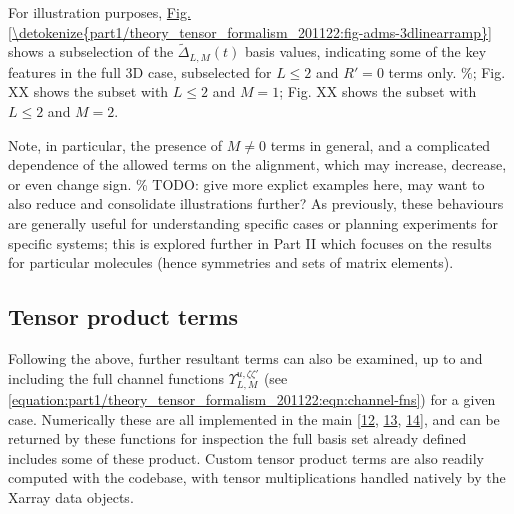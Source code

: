 \documentclass[letterpaper,table,10pt,english]{jupyterBook}
\begin{document}
\sphinxAtStartPar
For illustration purposes, \hyperref[\detokenize{part1/theory_tensor_formalism_201122:fig-adms-3dlinearramp}]{Fig.\@ \ref{\detokenize{part1/theory_tensor_formalism_201122:fig-adms-3dlinearramp}}} shows a subselection of the \(\tilde{\Delta}_{L,M}(t)\) basis values, indicating some of the key features in the full 3D case, subselected for \(L\leq2\) and \(R'=0\) terms only. \%; Fig. XX shows the subset with \(L\leq2\) and \(M=1\); Fig. XX shows the subset with \(L\leq2\) and \(M=2\).

\sphinxAtStartPar
Note, in particular, the presence of \(M\neq0\) terms in general, and a complicated dependence of the allowed terms on the alignment, which may increase, decrease, or even change sign. \% TODO: give more explict examples here, may want to also reduce and consolidate illustrations further?
As previously, these behaviours are generally useful for understanding specific cases or planning experiments for specific systems; this is explored further in Part II which focuses on the results for particular molecules (hence symmetries and sets of matrix elements).


\subsection{Tensor product terms}
\label{\detokenize{part1/theory_tensor_formalism_201122:tensor-product-terms}}\label{\detokenize{part1/theory_tensor_formalism_201122:sec-theory-tensor-products}}
\sphinxAtStartPar
Following the above, further resultant terms can also be examined, up to and including the full channel functions \(\varUpsilon_{L,M}^{u,\zeta\zeta'}\) (see \eqref{equation:part1/theory_tensor_formalism_201122:eqn:channel-fns}) for a given case. Numerically these are all implemented in the main  {[}\hyperlink{cite.backmatter/bibliography:id561}{12}, \hyperlink{cite.backmatter/bibliography:id508}{13}, \hyperlink{cite.backmatter/bibliography:id506}{14}{]}, and can be returned by these functions for inspection \sphinxhyphen{} the full basis set already defined includes some of these product. Custom tensor product terms are also readily computed with the codebase, with tensor multiplications handled natively by the Xarray data objects.
\end{document}
